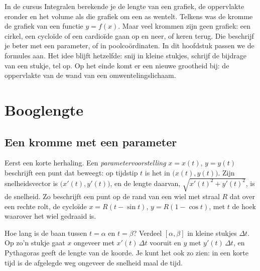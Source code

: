 In de cursus Integralen berekende je de lengte van een grafiek, de oppervlakte eronder en het volume als die grafiek om een as wentelt. Telkens was de kromme de grafiek van een functie $y = f(x)$. Maar veel krommen zijn geen grafiek: een cirkel, een cycloïde of een cardioïde gaan op en neer, of keren terug. Die beschrijf je beter met een parameter, of in poolcoördinaten. In dit hoofdstuk passen we de formules aan. Het idee blijft hetzelfde: snij in kleine stukjes, schrijf de bijdrage van een stukje, tel op. Op het einde komt er een nieuwe grootheid bij: de oppervlakte van de wand van een omwentelingslichaam.

\begin{oefeningen}[Start]

\end{oefeningen}


\section{Booglengte}

\subsection{Een kromme met een parameter}

Eerst een korte herhaling. Een \textit{parametervoorstelling} $x = x(t)$, $y = y(t)$ beschrijft een punt dat beweegt: op tijdstip $t$ is het in $\bigl(x(t), y(t)\bigr)$. Zijn snelheidsvector is $\bigl(x'(t), y'(t)\bigr)$, en de lengte daarvan, $\sqrt{x'(t)^2 + y'(t)^2}$, is de snelheid. Zo beschrijft een punt op de rand van een wiel met straal $R$ dat over een rechte rolt, de cycloïde $x = R(t - \sin t)$, $y = R(1 - \cos t)$, met $t$ de hoek waarover het wiel gedraaid is.

Hoe lang is de baan tussen $t = \alpha$ en $t = \beta$? Verdeel $[\alpha, \beta]$ in kleine stukjes $\Delta t$. Op zo'n stukje gaat $x$ ongeveer met $x'(t)\,\Delta t$ vooruit en $y$ met $y'(t)\,\Delta t$, en Pythagoras geeft de lengte van de koorde. Je kunt het ook zo zien: in een korte tijd is de afgelegde weg ongeveer de snelheid maal de tijd.

